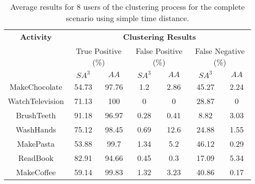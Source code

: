 \begin{table}[htbp]\scriptsize
  \begin{center}
        \begin{tabular}{ccccccc}
            \hline            
            \textbf{Activity} & \multicolumn{6}{c}{\textbf{Clustering Results}} \\
             & \multicolumn{2}{c}{True Positive (\%)} & \multicolumn{2}{c}{False Positive (\%)} & \multicolumn{2}{c}{False Negative (\%)} \\
             & $SA^3$ & $AA$ & $SA^3$ & $AA$ & $SA^3$ & $AA$ \\
            \hline
            MakeChocolate   & 54.73 & 97.76 & 1.2  & 2.86 & 45.27 & 2.24 \\
	    WatchTelevision & 71.13 & 100   & 0    & 0    & 28.87 & 0    \\
	    BrushTeeth      & 91.18 & 96.97 & 0.28 & 0.41 & 8.82  & 3.03 \\
	    WashHands       & 75.12 & 98.45 & 0.69 & 12.6 & 24.88 & 1.55 \\
	    MakePasta       & 53.88 & 99.7  & 1.34 & 5.2  & 46.12 & 0.29 \\
	    ReadBook        & 82.91 & 94.66 & 0.45 & 0.3  & 17.09 & 5.34 \\
	    MakeCoffee      & 59.14 & 99.83 & 1.32 & 3.23 & 40.86 & 0.17 \\
            \hline
        \end{tabular}
        \caption{Average results for 8 users of the clustering process for the complete scenario using simple time distance.}
        \label{tab-r-comp-t0}
        \end{center}
\end{table}
